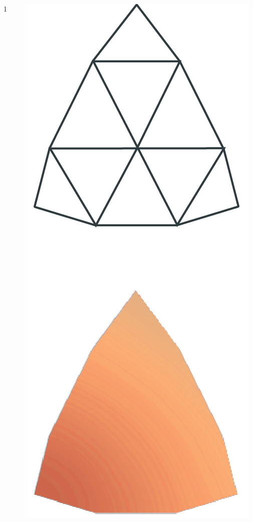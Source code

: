 \begin{frame}
\begin{columns}
\begin{column}[b]{0.22\textwidth}
\begin{center}
				\small{1}
			\end{center}	
		\end{column}
		\begin{column}[b]{0.22\textwidth}
			\begin{center}
				\includegraphics[width=\textwidth]{./img/1_single/lod_lod2.png}	

\end{center}
\end{column}
\end{columns}
\end{frame}
